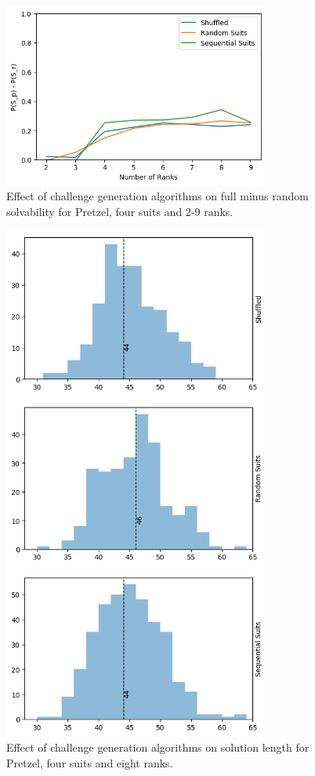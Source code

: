 \documentclass[journal]{IEEEtran}
\begin{document}
\begin{figure}[t]
\includegraphics[width=8.8cm]{pretzeldiffdist.png}
\caption{Effect of challenge generation algorithms on full minus random solvability for Pretzel, four suits and 2-9 ranks.}
\label{fig:pretzelfullsolve}
\end{figure}

\begin{figure}[t]
\includegraphics[width=8.8cm]{pretzel48lengthhist.png}
\caption{Effect of challenge generation algorithms on solution length for Pretzel, four suits and eight ranks.}
\label{fig:pretzelfullsolve}
\end{figure}
\end{document}
